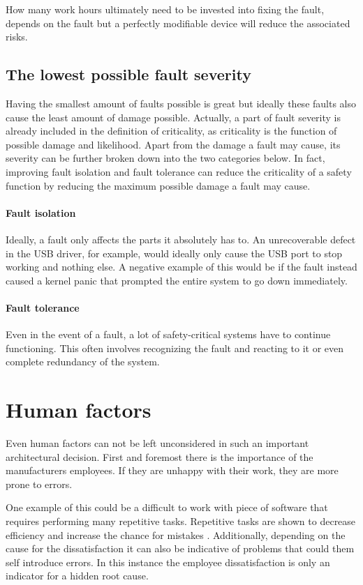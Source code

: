 How many work hours ultimately need to be invested into fixing the fault, depends on the fault but a perfectly modifiable device will reduce the associated risks.
\subsection{The lowest possible fault severity}
Having the smallest amount of faults possible is great but ideally these faults also cause the least amount of damage possible. Actually, a part of fault severity is already included in the definition of criticality, as criticality is the function of possible damage and likelihood. Apart from the damage a fault may cause, its severity can be further broken down into the two categories below. In fact, improving fault isolation and fault tolerance can reduce the criticality of a safety function by reducing the maximum possible damage a fault may cause.

\paragraph{Fault isolation}
Ideally,  a fault only affects the parts it absolutely has to. An unrecoverable defect in the USB driver, for example, would ideally only cause the USB port to stop working and nothing else. A negative example of this would be if the fault instead caused a kernel panic that prompted the entire system to go down immediately.
\paragraph{Fault tolerance}
Even in the event of a fault, a lot of safety-critical systems have to continue functioning. This often involves recognizing the fault and reacting to it or even complete redundancy of the system.

\section{Human factors}
Even human factors can not be left unconsidered in such an important architectural decision. First and foremost there is the importance of the manufacturers employees. If they are unhappy with their work, they are more prone to errors.

One example of this could be a difficult to work with piece of software that requires performing many repetitive tasks. Repetitive tasks are shown to decrease efficiency and increase the chance for mistakes \cite{Wyatt.1937}. Additionally, depending on the cause for the dissatisfaction it can also be indicative of problems that could them self introduce errors. In this instance the employee dissatisfaction is only an indicator for a hidden root cause.

